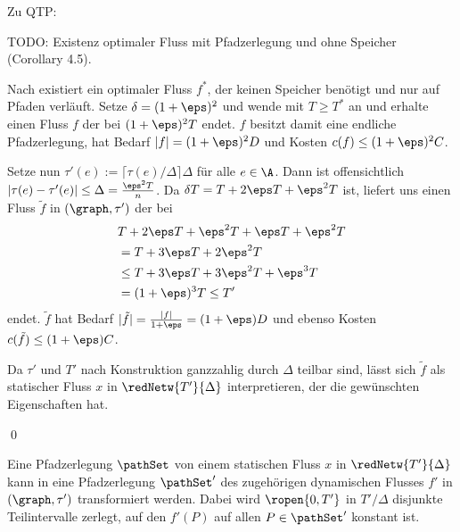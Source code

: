 Zu QTP:
\begin{theorem}\label{theo:qtp_opt_flow}
    TODO: Existenz optimaler Fluss mit Pfadzerlegung und ohne Speicher
     (Corollary 4.5).
\end{theorem}

\begin{standaloneProof}
    Nach  existiert ein optimaler Fluss $f^*$, der
    keinen Speicher benötigt und nur auf Pfaden verläuft.
    Setze $\delta = (1 + \eps)^2$ und wende  mit
    $T \geq T^*$ an und erhalte einen Fluss $f$ der bei $(1 + \eps)^2 T$ endet.
    $f$ besitzt damit eine endliche Pfadzerlegung, hat Bedarf
    $|f| = (1 + \eps)^2 D$ und Kosten $c(f) \leq (1 + \eps)^2 C$.
    
    Setze nun $\tau'(e) := \lceil \tau(e) / \Delta \rceil \Delta$ für
    alle $e \in \A$. Dann ist offensichtlich
    $|\tau(e) - \tau'(e)| \leq \Delta = \frac{\eps^2 T}{n}$.
    Da $\delta T = T + 2 \eps T + \eps^2 T$ ist, liefert
     uns einen Fluss $\tilde{f}$ in $(\graph, \tau')$
    der bei
    \begin{align*}
        & T + 2 \eps T + \eps^2 T + \eps T + \eps^2 T \\
        & = T + 3 \eps T + 2 \eps^2 T \\
        & \leq T + 3 \eps T + 3 \eps^2 T + \eps^3 T \\
        & = (1 + \eps)^3 T \leq T'
    \end{align*}
    endet. $\tilde{f}$ hat Bedarf
    $|\tilde{f}| = \frac{|f|}{1+\eps} = (1 + \eps) D$ und ebenso
    Kosten $c(\tilde{f}) \leq (1 + \eps) C$.
    
    Da $\tau'$ und $T'$ nach Konstruktion ganzzahlig durch
    $\Delta$ teilbar sind, lässt sich $\tilde{f}$ als statischer Fluss $x$ in
    $\redNetw{T'}{\Delta}$ interpretieren, der die gewünschten
    Eigenschaften hat.
    
    \begin{flushright}\qed \end{flushright}
\end{standaloneProof}

\begin{lemma}\label{lem:path_decomp}
    Eine Pfadzerlegung $\pathSet$ von einem statischen Fluss $x$ in
    $\redNetw{T'}{\Delta}$ kann in eine Pfadzerlegung $\pathSet'$ des
    zugehörigen dynamischen Flusses $f'$ in $(\graph, \tau')$ 
    transformiert werden. Dabei wird $\ropen{0, T'}$ in $T'/\Delta$
    disjunkte Teilintervalle zerlegt, auf den $f'(P)$ auf allen $P \in \pathSet'$
    konstant ist.
\end{lemma}

